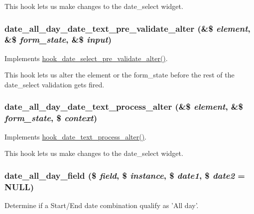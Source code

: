 This hook lets us make changes to the date\_\-select widget. \hypertarget{date__all__day_8module_aa3e08cbb1ae3d12b7850442cfc4721f1}{
\subsubsection[{date\_\-all\_\-day\_\-date\_\-text\_\-pre\_\-validate\_\-alter}]{\setlength{\rightskip}{0pt plus 5cm}date\_\-all\_\-day\_\-date\_\-text\_\-pre\_\-validate\_\-alter (\&\$ {\em element}, \/  \&\$ {\em form\_\-state}, \/  \&\$ {\em input})}}
\label{date__all__day_8module_aa3e08cbb1ae3d12b7850442cfc4721f1}
Implements \hyperlink{date_8api_8php_a8fa3364916ca73163501f3b9fa319dd6}{hook\_\-date\_\-select\_\-pre\_\-validate\_\-alter()}.

This hook lets us alter the element or the form\_\-state before the rest of the date\_\-select validation gets fired. \hypertarget{date__all__day_8module_a1303234af56bf777340291beb37d9e88}{
\subsubsection[{date\_\-all\_\-day\_\-date\_\-text\_\-process\_\-alter}]{\setlength{\rightskip}{0pt plus 5cm}date\_\-all\_\-day\_\-date\_\-text\_\-process\_\-alter (\&\$ {\em element}, \/  \&\$ {\em form\_\-state}, \/  \$ {\em context})}}
\label{date__all__day_8module_a1303234af56bf777340291beb37d9e88}
Implements \hyperlink{date_8api_8php_ac8d820dc0acb6675634de00189114786}{hook\_\-date\_\-text\_\-process\_\-alter()}.

This hook lets us make changes to the date\_\-select widget. \hypertarget{date__all__day_8module_ac20133ba5eee4f790d2a29eed85b1a91}{
\subsubsection[{date\_\-all\_\-day\_\-field}]{\setlength{\rightskip}{0pt plus 5cm}date\_\-all\_\-day\_\-field (\$ {\em field}, \/  \$ {\em instance}, \/  \$ {\em date1}, \/  \$ {\em date2} = {\ttfamily NULL})}}
\label{date__all__day_8module_ac20133ba5eee4f790d2a29eed85b1a91}
Determine if a Start/End date combination qualify as 'All day'.


